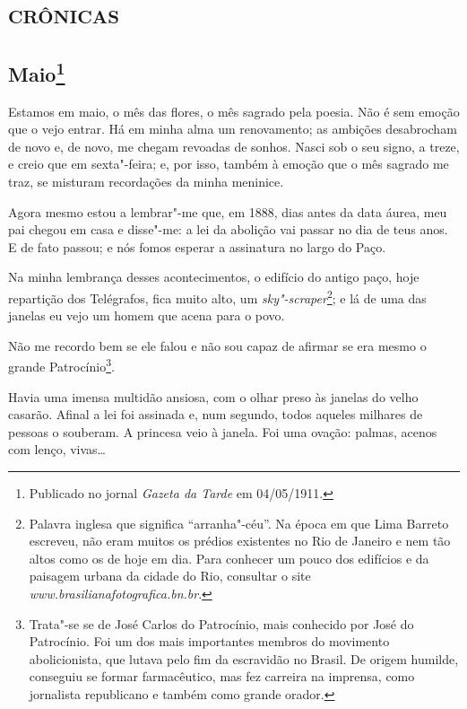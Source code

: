 \part{\textsc{crônicas}}


\chapter[Maio]{Maio\footnote[*]{Publicado no jornal \emph{Gazeta da Tarde} em 04/05/1911.}}

Estamos em maio, o mês das flores, o mês sagrado pela poesia. Não é sem
emoção que o vejo entrar. Há em minha alma um renovamento; as ambições
desabrocham de novo e, de novo, me chegam revoadas de sonhos. Nasci sob
o seu signo, a treze, e creio que em sexta"-feira; e, por isso, também à
emoção que o mês sagrado me traz, se misturam recordações da minha
meninice.

Agora mesmo estou a lembrar"-me que, em 1888, dias antes da data áurea,
meu pai chegou em casa e disse"-me: a lei da abolição vai passar no dia
de teus anos. E de fato passou; e nós fomos esperar a assinatura no
largo do Paço.

Na minha lembrança desses acontecimentos, o edifício do antigo paço,
hoje repartição dos Telégrafos, fica muito alto, um
\emph{sky"-scraper}\footnote{Palavra inglesa que significa
  ``arranha"-céu''. Na época em que Lima Barreto escreveu, não eram
  muitos os prédios existentes no Rio de Janeiro e nem tão altos como os
  de hoje em dia. Para conhecer um pouco dos edifícios e da paisagem
  urbana da cidade do Rio, consultar o site
  \emph{www.brasilianafotografica.bn.br}.};
e lá de uma das janelas eu vejo um homem que acena para o povo.

Não me recordo bem se ele falou e não sou capaz de afirmar se era mesmo
o grande Patrocínio\footnote{Trata"-se se de José Carlos do Patrocínio,
  mais conhecido por José do Patrocínio. Foi um dos mais importantes
  membros do movimento abolicionista, que lutava pelo fim da escravidão
  no Brasil. De origem humilde, conseguiu se formar farmacêutico, mas
  fez carreira na imprensa, como jornalista republicano e também como
  grande orador.}.

Havia uma imensa multidão ansiosa, com o olhar preso às janelas do velho
casarão. Afinal a lei foi assinada e, num segundo, todos aqueles
milhares de pessoas o souberam. A princesa veio à janela. Foi uma
ovação: palmas, acenos com lenço, vivas\ldots{}

